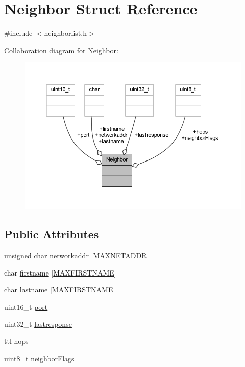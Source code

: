 \hypertarget{struct_neighbor}{}\section{Neighbor Struct Reference}
\label{struct_neighbor}


{\ttfamily \#include $<$neighborlist.\+h$>$}



Collaboration diagram for Neighbor\+:\nopagebreak
\begin{figure}[H]
\begin{center}
\leavevmode
\includegraphics[width=350pt]{struct_neighbor__coll__graph}
\end{center}
\end{figure}
\subsection*{Public Attributes}
\begin{DoxyCompactItemize}
\item 
unsigned char \hyperlink{struct_neighbor_a6bc80628de6e4c9aeff5110d6deef9d4}{networkaddr} \mbox{[}\hyperlink{haha_utils_8h_a64e48eb75238bd3d7a053f19071044a8}{M\+A\+X\+N\+E\+T\+A\+D\+DR}\mbox{]}
\item 
char \hyperlink{struct_neighbor_a5a5a3eaf67b27d5db06a3ce56af1082d}{firstname} \mbox{[}\hyperlink{haha_utils_8h_ac3dd1c10edba39fc5737be5b96a91d2a}{M\+A\+X\+F\+I\+R\+S\+T\+N\+A\+ME}\mbox{]}
\item 
char \hyperlink{struct_neighbor_ab58656971c71c0fc0cc4610e16f92a47}{lastname} \mbox{[}\hyperlink{haha_utils_8h_ac3dd1c10edba39fc5737be5b96a91d2a}{M\+A\+X\+F\+I\+R\+S\+T\+N\+A\+ME}\mbox{]}
\item 
uint16\+\_\+t \hyperlink{struct_neighbor_a18b5cd42623d929f155daa37b6b1bff1}{port}
\item 
uint32\+\_\+t \hyperlink{struct_neighbor_a78cd1ddbf02168247647691ccea29602}{lastresponse}
\item 
\hyperlink{haha_utils_8h_a22ca626eb8f0deb847d1fae89476e26d}{ttl} \hyperlink{struct_neighbor_a1b3e73523c604b66fb9674dcf1ffade7}{hops}
\item 
uint8\+\_\+t \hyperlink{struct_neighbor_ae2738c5549836389e9d6c0e8f78df134}{neighbor\+Flags}
\end{DoxyCompactItemize}


